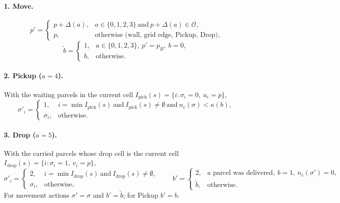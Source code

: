 \documentclass[11pt]{article}
\newcommand{\Open}{\mathcal{O}}
\begin{document}
\paragraph{1. Move.}
\begin{equation}
p'=\begin{cases}p+\Delta(a), & a\in\{0,1,2,3\}\ \text{and}\ p+\Delta(a)\in\Open,\\ p, & \text{otherwise (wall, grid edge, Pickup, Drop)},\end{cases}
\end{equation}
\begin{equation}
\tilde b=\begin{cases}1, & a\in\{0,1,2,3\},\ p'=p_B,\ b=0,\\ b, & \text{otherwise}.\end{cases}
\end{equation}

\paragraph{2. Pickup ($a=4$).} With the waiting parcels in the current cell $I_{\mathrm{pick}}(s)=\{i:\sigma_i=0,\ u_i=p\}$,
\begin{equation}
\sigma'_i=\begin{cases}1, & i=\min I_{\mathrm{pick}}(s)\ \text{and}\ I_{\mathrm{pick}}(s)\neq\emptyset\ \text{and}\ n_c(\sigma)<\kappa(b),\\ \sigma_i, & \text{otherwise}.\end{cases}
\end{equation}

\paragraph{3. Drop ($a=5$).} With the carried parcels whose drop cell is the current cell $I_{\mathrm{drop}}(s)=\{i:\sigma_i=1,\ v_i=p\}$,
\begin{equation}
\sigma'_i=\begin{cases}2, & i=\min I_{\mathrm{drop}}(s)\ \text{and}\ I_{\mathrm{drop}}(s)\neq\emptyset,\\ \sigma_i, & \text{otherwise},\end{cases}
\qquad
b'=\begin{cases}2, & \text{a parcel was delivered},\ b=1,\ n_c(\sigma')=0,\\ \tilde b, & \text{otherwise}.\end{cases}
\end{equation}
For movement actions $\sigma'=\sigma$ and $b'=\tilde b$; for Pickup $b'=b$.
\end{document}
